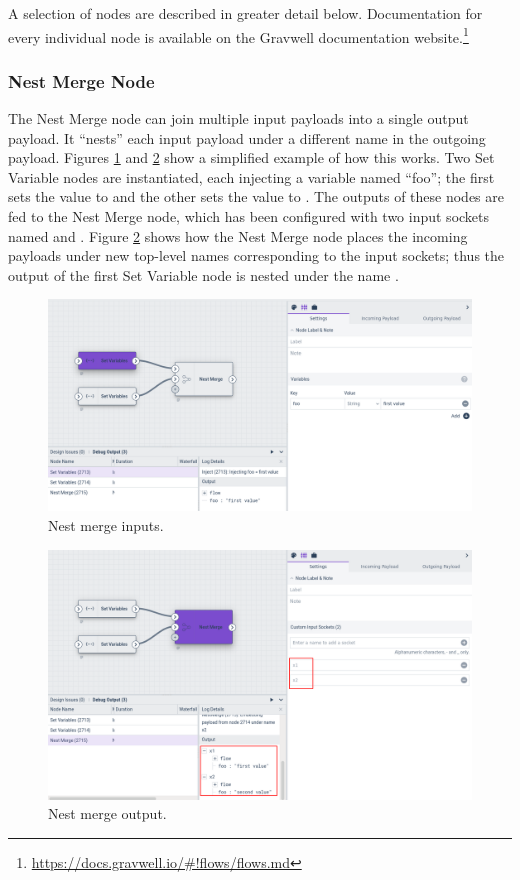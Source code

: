 A selection of nodes are described in greater detail below. Documentation for every individual node is available on the Gravwell documentation website.\footnote{\href{https://docs.gravwell.io/\#!flows/flows.md}{https://docs.gravwell.io/\#!flows/flows.md}}

\subsubsection{Nest Merge Node}
The Nest Merge node can join multiple input payloads into a single output payload. It ``nests'' each input payload under a different name in the outgoing payload. Figures \ref{fig:nestmerge1} and \ref{fig:nestmerge2} show a simplified example of how this works. Two Set Variable nodes are instantiated, each injecting a variable named ``foo''; the first sets the value to  and the other sets the value to . The outputs of these nodes are fed to the Nest Merge node, which has been configured with two input sockets named  and . Figure \ref{fig:nestmerge2} shows how the Nest Merge node places the incoming payloads under new top-level names corresponding to the input sockets; thus the  output of the first Set Variable node is nested under the name .

\begin{figure}
	\includegraphics[width=0.85\linewidth]{images/nestmerge1.png}
	\caption{Nest merge inputs.}
	\label{fig:nestmerge1}
\end{figure}

\begin{figure}
	\includegraphics[width=0.85\linewidth]{images/nestmerge2.png}
	\caption{Nest merge output.}
	\label{fig:nestmerge2}
\end{figure}

